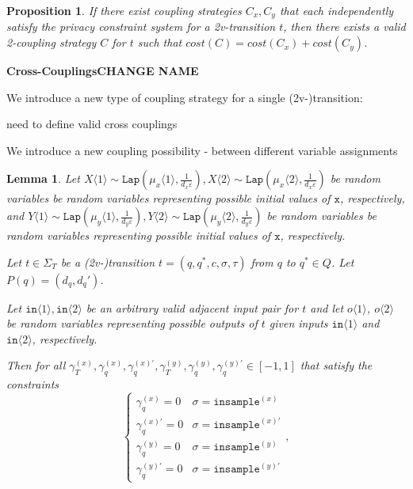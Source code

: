\documentclass[12pt]{article}
\newcommand{\brangle}[1]{\langle #1 \rangle}
\newcommand{\Lap}{\texttt{Lap}}
\newtheorem{lemma}[thm]{Lemma}
\newtheorem{prop}[thm]{Proposition}
\theoremstyle{definition}
\begin{document}
\begin{prop}
    If there exist coupling strategies $C_x, C_y$ that each independently satisfy the privacy constraint system for a 2v-transition $t$, then there exists a valid 2-coupling strategy $C$ for $t$ such that $cost(C) = cost(C_x)+cost(C_y)$. 
\end{prop}

\textbf{Cross-Couplings{\color{red}CHANGE NAME}}

We introduce a new type of coupling strategy for a single (2v-)transition:

{\color{red} need to define valid cross couplings}

We introduce a new coupling possibility - between different variable assignments


\begin{lemma}\label{mvIndTransitionCoupling}
    Let $X\brangle{1}\sim \Lap(\mu_x\brangle{1}, \frac{1}{d_x\varepsilon}), X\brangle{2}\sim\Lap(\mu_x\brangle{2}, \frac{1}{d_x\varepsilon})$ be random variables be random variables representing possible initial values of $\texttt{x}$, respectively, and $Y\brangle{1}\sim \Lap(\mu_y\brangle{1}, \frac{1}{d_y\varepsilon}), Y\brangle{2}\sim\Lap(\mu_y\brangle{2}, \frac{1}{d_y\varepsilon})$ be random variables be random variables representing possible initial values of $\texttt{x}$, respectively. 

    Let $t\in \Sigma_T$ be a  (2v-)transition $t = (q, q^*, c, \sigma, \tau)$ from $q$ to $q^*\in Q$. Let $P(q) = (d_q, d_q')$.

    Let $\texttt{in}\brangle{1}, \texttt{in}\brangle{2}$ be an arbitrary valid adjacent input pair for $t$ and let $o\brangle{1}$, $o\brangle{2}$ be random variables representing possible outputs of $t$ given inputs $\texttt{in}\brangle{1}$ and $\texttt{in}\brangle{2}$, respectively. 

    Then for all $\gamma_T^{(x)}, \gamma_q^{(x)}, \gamma_q^{(x)\prime},\gamma_T^{(y)}, \gamma_q^{(y)}, \gamma_q^{(y)\prime} \in [-1, 1]$ that satisfy the constraints \[
        \begin{cases}
          \gamma_q^{(x)}=0 & \sigma = \texttt{insample}^{(x)}\\
          \gamma_q^{(x)\prime}=0 & \sigma = \texttt{insample}^{(x)\prime}\\
          \gamma_q^{(y)}=0 & \sigma = \texttt{insample}^{(y)}\\
          \gamma_q^{(y)\prime}=0 & \sigma = \texttt{insample}^{(y)\prime}
        \end{cases},
      \]


\end{lemma}
\end{document}
